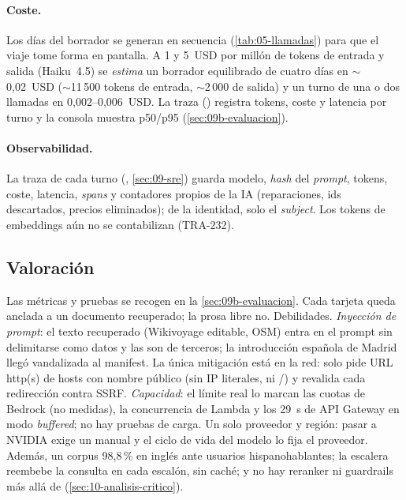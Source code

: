 \paragraph{Coste.} Los días del borrador se generan en secuencia (\cref{tab:05-llamadas}) para
que el viaje tome forma en pantalla. A 1 y 5~USD por millón de tokens de entrada y salida
(Haiku~4.5) se \emph{estima} un borrador equilibrado de cuatro días en $\sim$0,02~USD
($\sim$11\,500 tokens de entrada, $\sim$2\,000 de salida) y un turno de una o dos llamadas en
0,002--0,006~USD. La traza () registra tokens, coste y latencia por turno y la consola
muestra p50/p95 (\cref{sec:09b-evaluacion}).

\paragraph{Observabilidad.} La traza de cada turno (, \cref{sec:09-sre}) guarda
modelo, \emph{hash} del \emph{prompt}, tokens, coste, latencia, \emph{spans} y contadores
propios de la IA (reparaciones, ids descartados, precios eliminados); de la identidad, solo el
\emph{subject}. Los tokens de embeddings aún no se contabilizan (TRA-232).

\subsection{Valoración}

Las métricas y pruebas se recogen en la \cref{sec:09b-evaluacion}. Cada tarjeta queda anclada a un documento recuperado; la prosa libre no. Debilidades. \emph{Inyección de prompt}: el texto recuperado (Wikivoyage editable,
OSM) entra en el prompt sin delimitarse como datos y las  son de terceros; la
introducción española de Madrid llegó vandalizada al manifest. La
única mitigación está en la red: 
solo pide URL http(s) de hosts con nombre público (sin IP literales,  ni
/) y revalida cada redirección contra SSRF. \emph{Capacidad}: el
límite real lo marcan las cuotas de Bedrock (no medidas), la concurrencia de Lambda y los 29~s de API
Gateway en modo \emph{buffered}; no hay pruebas de carga. Un solo proveedor y región: pasar a
NVIDIA exige un  manual y el ciclo de vida del modelo lo fija el proveedor. Además, un
corpus 98,8\,\% en inglés ante usuarios hispanohablantes; la
escalera reembebe la consulta en cada escalón, sin caché; y no hay reranker ni guardrails más
allá de  (\cref{sec:10-analisis-critico}).

